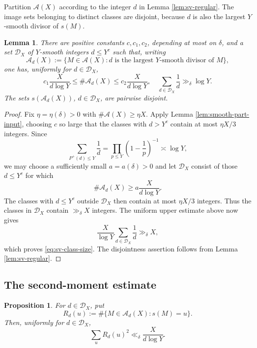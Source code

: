 \documentclass[11pt,letterpaper,reqno]{amsart}
\numberwithin{equation}{section}
\newtheorem{lemma}[theorem]{Lemma}
\newtheorem{proposition}[theorem]{Proposition}
\theoremstyle{remark}
\renewcommand{\leq}{\leqslant}
\renewcommand{\geq}{\geqslant}
\begin{document}
Partition $\mathcal{A}(X)$ according to the integer $d$ in
Lemma \ref{lem:sv-regular}. The image sets belonging to distinct classes
are disjoint, because $d$ is also the largest $Y$-smooth divisor of $s(M)$.

\begin{lemma}\label{lem:sv-classes}
There are positive constants $c,c_1,c_2$, depending at most on $\delta$, and a set $\mathcal{D}_X$ of $Y$-smooth
integers $d\leq Y^c$ such that, writing
\[
 \mathcal{A}_d(X):=\{M\in\mathcal{A}(X):d
 \text{ is the largest $Y$-smooth divisor of }M\},
\]
one has, uniformly for $d\in\mathcal{D}_X$,
\begin{equation}\label{eq:sv-class-size}
 c_1\frac{X}{d\log Y}
 \leq\#\mathcal{A}_d(X)
 \leq c_2\frac{X}{d\log Y},
 \quad
 \sum_{d\in\mathcal{D}_X}\frac1d\gg_\delta\log Y.
\end{equation}
The sets $s(\mathcal{A}_d(X))$, $d\in\mathcal{D}_X$, are pairwise disjoint.
\end{lemma}

\begin{proof}
Fix $\eta=\eta(\delta)>0$ with $\#\mathcal{A}(X)\geq\eta X$.
Apply Lemma \ref{lem:smooth-part-input}, choosing $c$ so large that the
classes with $d>Y^c$ contain at most $\eta X/3$ integers. Since
\[
 \sum_{P^+(d)\leq Y}\frac1d
 =\prod_{p\leq Y}\left(1-\frac1p\right)^{-1}
 \asymp\log Y,
\]
we may choose a sufficiently small $a=a(\delta)>0$ and let $\mathcal{D}_X$
consist of those $d\leq Y^c$ for which
\[
 \#\mathcal{A}_d(X)\geq a\frac{X}{d\log Y}.
\]
The classes with $d\leq Y^c$ outside $\mathcal{D}_X$ then contain at most $\eta X/3$ integers.
Thus the classes in $\mathcal{D}_X$ contain $\gg_\delta X$ integers. The
uniform upper estimate above now gives
\[
 \frac{X}{\log Y}\sum_{d\in\mathcal{D}_X}\frac1d
 \gg_\delta X,
\]
which proves \eqref{eq:sv-class-size}. The disjointness assertion follows
from Lemma \ref{lem:sv-regular}.
\end{proof}

\subsection{The second-moment estimate}

\begin{proposition}\label{prop:sv-second-moment}
For $d\in\mathcal{D}_X$, put
\[
 R_d(u):=\#\{M\in\mathcal{A}_d(X):s(M)=u\}.
\]
Then, uniformly for $d\in\mathcal{D}_X$,
\begin{equation}\label{eq:sv-second-moment}
 \sum_uR_d(u)^2\ll_\delta\frac{X}{d\log Y}.
\end{equation}
\end{proposition}
\end{document}
